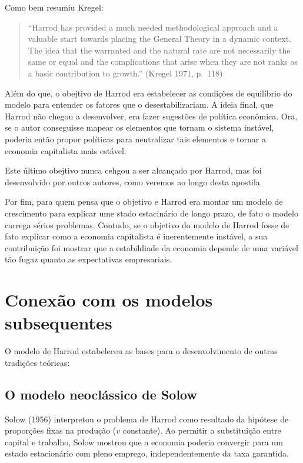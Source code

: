 \documentclass[
  brazilian,
  letterpaper,
  DIV=11,
  numbers=noendperiod]{scrreprt}
\begin{document}
Como bem resumiu Kregel:

\begin{quote}
``Harrod has provided a much needed methodological approach and a
valuable start towards placing the General Theory in a dynamic context.
The idea that the warranted and the natural rate are not necessarily the
same or equal and the complications that arise when they are not ranks
as a basic contribution to growth.'' (Kregel 1971, p.~118)
\end{quote}

Além do que, o obejtivo de Harrod era estabelecer as condições de
equilíbrio do modelo para entender os fatores que o desestabilizariam. A
ideia final, que Harrod não chegou a desenvolver, era fazer sugestões de
política econômica. Ora, se o autor conseguisse mapear os elementos que
tornam o sistema instável, poderia então propor políticas para
neutralizar tais elementos e tornar a economia capitalista mais estável.

Este último obejtivo nunca cehgou a ser alcançado por Harrod, mas foi
desenvolvido por outros autores, como veremos ao longo desta apostila.

Por fim, para quem pensa que o objetivo e Harrod era montar um modelo de
crescimento para explicar ume stado estacinário de longo prazo, de fato
o modelo carrega sérios problemas. Contudo, se o objetivo do modelo de
Harrod fosse de fato explicar como a economia capitalista é
inerentemente instável, a sua contribuição foi mostrar que a
estabildiade da economia depende de uma variável tão fugaz quanto as
expectativas empresariais.

\section{Conexão com os modelos subsequentes}\label{sec-conexao-harrod}

O modelo de Harrod estabeleceu as bases para o desenvolvimento de outras
tradições teóricas:

\subsection{O modelo neoclássico de
Solow}\label{o-modelo-neocluxe1ssico-de-solow}

Solow (1956) interpretou o problema de Harrod como resultado da hipótese
de proporções fixas na produção (\(v\) constante). Ao permitir a
substituição entre capital e trabalho, Solow mostrou que a economia
poderia convergir para um estado estacionário com pleno emprego,
independentemente da taxa garantida.
\end{document}
